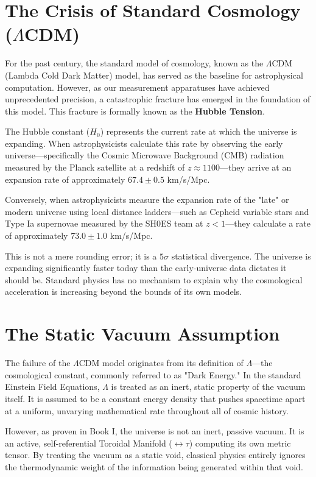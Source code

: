 \documentclass[12pt,openany]{book}
\begin{document}
\section{The Crisis of Standard Cosmology ($\Lambda$CDM)}
For the past century, the standard model of cosmology, known as the $\Lambda$CDM (Lambda Cold Dark Matter) model, has served as the baseline for astrophysical computation. However, as our measurement apparatuses have achieved unprecedented precision, a catastrophic fracture has emerged in the foundation of this model. This fracture is formally known as the \textbf{Hubble Tension}.

The Hubble constant ($H_0$) represents the current rate at which the universe is expanding. When astrophysicists calculate this rate by observing the early universe—specifically the Cosmic Microwave Background (CMB) radiation measured by the Planck satellite at a redshift of $z \approx 1100$—they arrive at an expansion rate of approximately $67.4 \pm 0.5$ km/s/Mpc. 

Conversely, when astrophysicists measure the expansion rate of the "late" or modern universe using local distance ladders—such as Cepheid variable stars and Type Ia supernovae measured by the SH0ES team at $z < 1$—they calculate a rate of approximately $73.0 \pm 1.0$ km/s/Mpc. 

This is not a mere rounding error; it is a $5\sigma$ statistical divergence. The universe is expanding significantly faster today than the early-universe data dictates it should be. Standard physics has no mechanism to explain why the cosmological acceleration is increasing beyond the bounds of its own models.

\section{The Static Vacuum Assumption}
The failure of the $\Lambda$CDM model originates from its definition of $\Lambda$—the cosmological constant, commonly referred to as "Dark Energy." In the standard Einstein Field Equations, $\Lambda$ is treated as an inert, static property of the vacuum itself. It is assumed to be a constant energy density that pushes spacetime apart at a uniform, unvarying mathematical rate throughout all of cosmic history.

However, as proven in Book I, the universe is not an inert, passive vacuum. It is an active, self-referential Toroidal Manifold ($\leftrightarrow\tau$) computing its own metric tensor. By treating the vacuum as a static void, classical physics entirely ignores the thermodynamic weight of the information being generated within that void.
\end{document}
